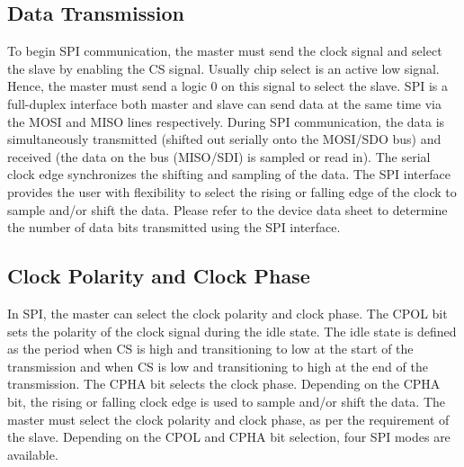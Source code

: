\subsection{Data Transmission}
To begin SPI communication, the master must send the clock signal and select the slave by enabling the CS signal. Usually chip select is an active low signal. Hence, the master must send a logic 0 on this signal to select the slave. SPI is a full-duplex interface both master and slave can send data at the same time via the MOSI and MISO lines respectively. During SPI communication, the data is simultaneously transmitted (shifted out serially onto the MOSI/SDO bus) and received (the data on the bus (MISO/SDI) is sampled or read in). The serial clock edge synchronizes the shifting and sampling of the data. The SPI interface provides the user with flexibility to select the rising or falling edge of the clock to sample and/or shift the data. Please refer to the device data sheet to determine the number of data bits transmitted using the SPI interface.

\clearpage
\subsection{Clock Polarity and Clock Phase}
In SPI, the master can select the clock polarity and clock phase. The CPOL bit sets the polarity of the clock signal during the idle state. The idle state is defined as the period when CS is high and transitioning to low at the start of the transmission and when CS is low and transitioning to high at the end of the transmission. The CPHA bit selects the clock phase. Depending on the CPHA bit, the rising or falling clock edge is used to sample and/or shift the data. The master must select the clock polarity and clock phase, as per the requirement of the slave. Depending on the CPOL and CPHA bit selection, four SPI modes are available. 

\begin{table}[H]
    \begin{center}
    \end{center}
\end{table}

